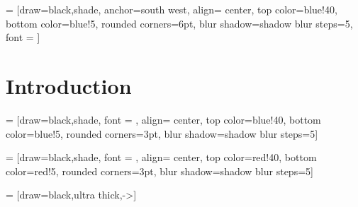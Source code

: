 \documentclass[svgnames]{beamer}
\date[Covid 2021 workshop]{Presentation Covid 2021 workshop}
\begin{document}


 = [draw=black,shade, 
      anchor=south west,
      align= center,
      top color=blue!40,
      bottom color=blue!5,
      rounded corners=6pt,
      blur shadow={shadow blur steps=5},
      font = \footnotesize]

\section{Introduction}


 = [draw=black,shade, 
      font = \footnotesize,
      align= center,
      top color=blue!40,
      bottom color=blue!5,
      rounded corners=3pt,
      blur shadow={shadow blur steps=5}]

 = [draw=black,shade, 
      font = \footnotesize,
      align= center,
      top color=red!40,
      bottom color=red!5,
      rounded corners=3pt,
      blur shadow={shadow blur steps=5}]

 = [draw=black,ultra thick,->]
\end{document}
